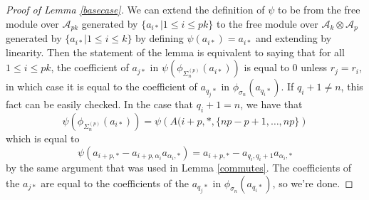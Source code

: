 \documentclass[11pt]{amsart}
\def\A{{\mathcal A}}
\def\s{{\sigma}}
\def\a{\alpha}
\newcommand\Sp{\Sigma^{(p)}}
\begin{document}
\begin{proof} [Proof of Lemma \ref{basecase}]
We can extend the definition of $\psi$ to be from the free module over $\A_{pk}$ generated by $\{a_{i*}|1\le i\le pk\}$ to the free module over $\A_{k}\otimes \A_{p}$ generated by $\{a_{i*}|1\le i\le k\}$ by defining $\psi(a_{i*}) = a_{i*}$ and extending by linearity.  Then the statement of the lemma is equivalent to saying that for all $1\le i\le pk$, the coefficient of $a_{j*}$ in $\psi\left(\phi_{\Sp_n}(a_{i*})\right)$ is equal to 0 unless $r_j = r_i$, in which case it is equal to the coefficient of $a_{q_j*}$ in $\phi_{\s_n}(a_{q_i*})$.  If $q_i + 1 \ne n$, this fact can be easily checked.  In the case that $q_i + 1 = n$, we have that
$$\psi\left(\phi_{\Sp_n}(a_{i*})\right) = \psi\left(A(i+p,*,\{np-p+1,\ldots,np\}\right)$$
\noindent which is equal to
$$\psi(a_{i+p,*} - a_{i+p,\a_i}a_{\a_i,*}) = a_{i+p,*} - a_{q_i,q_i+1}a_{\a_i,*}$$
by the same argument that was used in Lemma \ref{commutes}.  The coefficients of the $a_{j*}$ are equal to the coefficients of the $a_{q_j*}$ in $\phi_{\s_n}(a_{q_i*})$, so we're done.
\end{proof}














\end{document}
